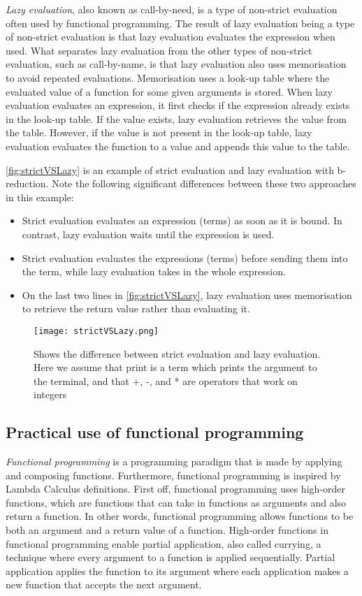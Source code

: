 \para
\emph{Lazy evaluation}, also known as call-by-need, is a type of non-strict evaluation often used by functional programming. The result of lazy evaluation being a type of non-strict evaluation is that lazy evaluation evaluates the expression when used. What separates lazy evaluation from the other types of non-strict evaluation, such as call-by-name, is that lazy evaluation also uses memorisation to avoid repeated evaluations.  Memorisation uses a look-up table where the evaluated value of a function for some given arguments is stored.  When lazy evaluation evaluates an expression, it first checks if the expression already exists in the look-up table. If the value exists, lazy evaluation retrieves the value from the table. However, if the value is not present in the look-up table, lazy evaluation evaluates the function to a value and appends this value to the table. 

\para
\autoref{fig:strictVSLazy} is an example of strict evaluation and lazy evaluation with b-reduction. Note the following significant differences between these two approaches in this example:

\begin{itemize}
    \item Strict evaluation evaluates an expression (terms) as soon as it is bound. In contrast, lazy evaluation waits until the expression is used.
    \item Strict evaluation evaluates the expressions (terms) before sending them into the term, while lazy evaluation takes in the whole expression.
    \item On the last two lines in \autoref{fig:strictVSLazy}, lazy evaluation uses memorisation to retrieve the return value rather than evaluating it.
\end{itemize}


\begin{figure}
    \centering
    \texttt{[image: strictVSLazy.png]}
    \caption{Shows the difference between strict evaluation and lazy evaluation. Here we assume that print is a term which prints the argument to the terminal, and that +, -, and * are operators that work on integers}
    \label{fig:strictVSLazy}
\end{figure}

\subsection{Practical use of functional programming}
\emph{Functional programming} is a programming paradigm that is made by applying and composing functions. Furthermore, functional programming is inspired by Lambda Calculus definitions. First off, functional programming uses high-order functions, which are functions that can take in functions as arguments and also return a function. In other words, functional programming allows functions to be both an argument and a return value of a function. High-order functions in functional programming enable partial application, also called currying, a technique where every argument to a function is applied sequentially. Partial application applies the function to its argument where each application makes a new function that accepts the next argument.

